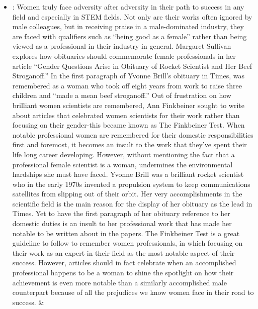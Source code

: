 \documentclass[12pt,a4paper]{article}
\begin{document}
\begin{enumerate}
\begin{itemize}
      \item {}: Women truly face adversity after adversity in their path to success in any field and especially in STEM fields. Not only are their works often ignored by male colleagues, but in receiving praise in a male-dominated industry, they are faced with qualifiers such as ``being good as a female'' rather than being viewed as a professional in their industry in general. Margaret Sullivan explores how obituaries should commemorate female professionals in her article ``Gender Questions Arise in Obituary of Rocket Scientist and Her Beef Stroganoff.'' In the first paragraph of Yvonne Brill’s obituary in Times, was remembered as a woman who took off eight years from work to raise three children and ``made a mean beef stroganoff.'' Out of frustration on how brilliant women scientists are remembered, Ann Finkbeiner sought to write about articles that celebrated women scientists for their work rather than focusing on their gender-this became known as The Finkbeiner Test. When notable professional women are remembered for their domestic responsibilities first and foremost, it becomes an insult to the work that they’ve spent their life long career developing. However, without mentioning the fact that a professional female scientist is a woman, undermines the environmental hardships she must have faced. Yvonne Brill was a brilliant rocket scientist who in the early 1970s invented a propulsion system to keep communications satellites from slipping out of their orbit. Her very accomplishments in the scientific field is the main reason for the display of her obituary as the lead in Times. Yet to have the first paragraph of her obituary reference to her domestic duties is an insult to her professional work that has made her notable to be written about in the papers. The Finkbeiner Test is a great guideline to follow to remember women professionals, in which focusing on their work as an expert in their field as the most notable aspect of their success. However, articles should in fact celebrate when an accomplished professional happens to be a woman to shine the spotlight on how their achievement is even more notable than a similarly accomplished male counterpart because of all the prejudices we know women face in their road to success.
      \href{https://web.archive.org/web/20170312212947/http:/www.doublexscience.org/the-finkbeiner-test/}{} \& \href{https://publiceditor.blogs.nytimes.com/2013/04/01/gender-questions-arise-in-obituary-of-rocket-scientist-and-her-beef-stroganoff/}{}

\end{itemize}
\end{enumerate}
\end{document}
